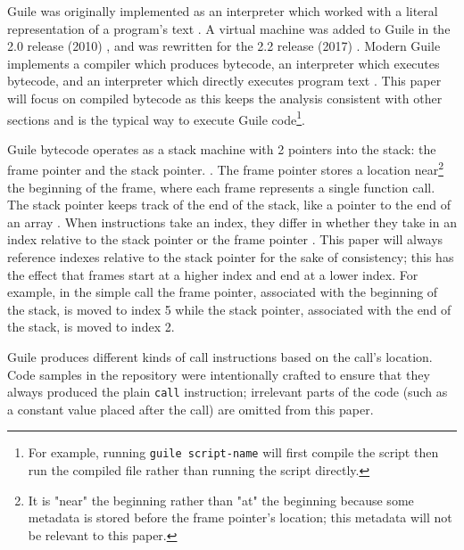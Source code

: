 Guile was originally implemented as an interpreter which worked with a literal
representation of a program's text
\parencite[][Section 9.3.1 "Why a VM?"]{guile-manual}.
A virtual machine was added to Guile in the 2.0 release (2010)
\parencite[][Section 9.1.4 "A Timeline of Selected Guile Releases"]{guile-manual}
\parencite[][NEWS lines 5068-5071]{guile-source},
and was rewritten for the 2.2 release (2017)
\parencite[][Section 9.1.4 "A Timeline of Selected Guile Releases"]{guile-manual}.
Modern Guile implements a compiler which produces bytecode, an interpreter which executes
bytecode, and an interpreter which directly executes program text
\parencite[][modules/language/scheme/spec.scm lines 43-45]{guile-source}.
This paper will focus on compiled bytecode as this keeps the analysis consistent with
other sections and is the typical way to execute Guile code\footnote{
  For example, running \texttt{guile script-name} will first compile the script then run
  the compiled file rather than running the script directly.
}.

Guile bytecode operates as a stack machine with 2 pointers into the stack: the frame
pointer and the stack pointer.
\parencite[][Section 9.3.2]{guile-manual}.
The frame pointer stores a location near\footnote{
  It is "near" the beginning rather than "at" the beginning because some metadata is
  stored before the frame pointer's location; this metadata will not be relevant to this
  paper.
}
the beginning of the frame, where each frame represents a single function call.
The stack pointer keeps track of the end of the stack, like a pointer to the end of an
array
\parencite[][Section 9.3.3]{guile-manual}.
When instructions take an index, they differ in whether they take in an index relative to
the stack pointer or the frame pointer
\parencite[][Section 9.3.5]{guile-manual}.
This paper will always reference indexes relative to the stack pointer for the sake of
consistency; this has the effect that frames start at a higher index and end at a lower
index.
For example, in the simple call the frame pointer, associated with the beginning of the
stack, is moved to index 5 while the stack pointer, associated with the end of the stack,
is moved to index 2.

Guile produces different kinds of call instructions based on the call's location.
Code samples in the repository were intentionally crafted to ensure that they always
produced the plain \texttt{call} instruction; irrelevant parts of the code (such as a
constant value placed after the call) are omitted from this paper.

